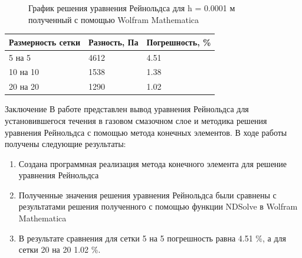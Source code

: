 \documentclass[ignoreonframetext,unicode]{beamer}
\begin{document}
\begin{frame}
	\begin{figure}[!htbp]
		\caption{График решения уравнения Рейнольдса для h = 0.0001 м полученный с помощью Wolfram Mathematica}
		\label{exactSolutionConst}
	\end{figure}

\begin{table}[!htbp]
	\begin{tabular}{|l|l|l|}
		\hline
		\multicolumn{1}{|c|}{Размерность сетки} & \multicolumn{1}{c|}{Разность, Па} & Погрешность, \% \\ \hline
		5 на 5                                  & 4612                              & 4.51            \\ \hline
		10 на 10                                & 1538                              & 1.38            \\ \hline
		20 на 20                                & 1290                              & 1.02            \\ \hline
	\end{tabular}
\end{table}
\end{frame}

\begin{frame}{Заключение}
	В работе представлен вывод уравнения Рейнольдса для установившегося течения в газовом смазочном слое и методика решения уравнения Рейнольдса с помощью метода конечных элементов. В ходе работы получены следующие результаты:
	\begin{block}{}
	\begin{enumerate}	
		\item Создана программная реализация метода конечного элемента для решение уравнения Рейнольдса
		\item Полученные значения решения уравнения Рейнольдса были сравнены с результатами решения полученного с помощью функции NDSolve в Wolfram Mathematica
		\item В результате сравнения для сетки 5 на 5 погрешность равна 4.51 \%, а для сетки 20 на 20 1.02 \%.
	\end{enumerate}
	\end{block}	
\end{frame}	
\end{document}
